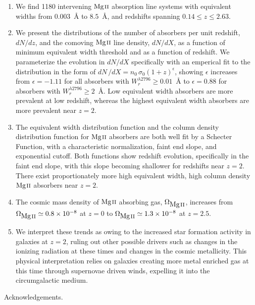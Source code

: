 \documentclass[iop,apj,numberedappendix,appendixfloats,twocolappendix]{emulateapj}
\begin{document}
\begin{enumerate}
\item We find 1180 intervening ${\hbox{{\rm Mg}\kern 0.1em{\sc ii}}}$ absorption line systems with equivalent widths from $0.003$~{\AA} to $8.5$~{\AA}, and redshifts spanning $0.14 \le z \le 2.63$. 
\item We present the distributions of the number of absorbers per unit redshift, $dN\!/dz$, and the comoving ${\hbox{{\rm Mg}\kern 0.1em{\sc ii}}}$ line density, $dN\!/dX$, as a function of minimum equivalent width threshold and as a function of redshift. We parameterize the evolution in $dN\!/dX$ specifically with an emperical fit to the distribution in the form of $dN\,/dX = n_0\,\sigma_0(1 + z)^{\epsilon}$, showing $\epsilon$ increases from $\epsilon=-1.11$ for all absorbers with $W_r^{\lambda2796} \ge 0.01$~{\AA} to $\epsilon=0.88$ for absorbers with $W_r^{\lambda2796} \ge 2$~{\AA}. Low equivalent width absorbers are more prevalent at low redshift, whereas the highest equivalent width absorbers are more prevalent near $z = 2$.
\item The equivalent width distribution function and the column density distribution function for ${\hbox{{\rm Mg}\kern 0.1em{\sc ii}}}$ absorbers are both well fit by a Schecter Function, with a characteristic normalization, faint end slope, and exponential cutoff. Both functions show redshift evolution, specifically in the faint end slope, with this slope becoming shallower for redshifts near $z = 2$. There exist proportionately more high equivalent width, high column density ${\hbox{{\rm Mg}\kern 0.1em{\sc ii}}}$ absorbers near $z = 2$.
\item The cosmic mass density of ${\hbox{{\rm Mg}\kern 0.1em{\sc ii}}}$ absorbing gas, $\Omega_{\hbox{{\rm Mg}\kern 0.1em{\sc ii}}}$, increases from $\Omega_{\hbox{{\rm Mg}\kern 0.1em{\sc ii}}} \simeq 0.8\times10^{-8}$ at $z = 0$ to $\Omega_{\hbox{{\rm Mg}\kern 0.1em{\sc ii}}} \simeq 1.3\times10^{-8}$ at $z = 2.5$.
\item We interpret these trends as owing to the increased star formation activity in galaxies at $z = 2$, ruling out other possible drivers such as changes in the ionizing radiation at these times and changes in the cosmic metallicity. This physical interpretation relies on galaxies creating more metal enriched gas at this time through supernovae driven winds, expelling it into the circumgalactic medium. 
\end{enumerate}

Acknowledgements.



\end{document}
